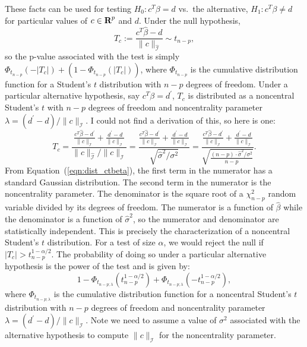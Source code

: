 \documentclass[12pt]{article}
\begin{document}
These facts can be used for testing $H_0: c^T \beta = d$ vs.~the alternative, $H_1: c^T \beta \neq d$ for particular values of $c \in {\mbox{\bf R}}^p$ and $d$. Under the null hypothesis,
\begin{equation}
\label{eqn:hts_olc}
   T_c := \frac{c^T \hat{\beta} - d}{\| c \|_{\hat{\mathcal{I}}}} \sim t_{n-p},
\end{equation}
so the p-value associated with the test is simply $\Phi_{t_{n-p}}(-|T_c|) + (1 - \Phi_{t_{n-p}}(|T_c|))$, where $\Phi_{t_{n-p}}$ is the cumulative distribution function for a Student's $t$ distribution with $n-p$ degrees of freedom. Under a particular alternative hypothesis, say $c^T \beta = d^\prime$, $T_c$ is distributed as a noncentral Student's $t$ with $n-p$ degrees of freedom and noncentrality parameter $\lambda = (d^\prime-d)/\| c \|_\mathcal{I}$. I could not find a derivation of this, so here is one:
\begin{displaymath}
   T_c = \frac{\frac{c^T \hat{\beta} - d^\prime}{\| c \|_\mathcal{I}} + \frac{d^\prime - d}{\| c \|_\mathcal{I}}}{\| c \|_{\hat{\mathcal{I}}} / \| c \|_\mathcal{I}}
   = \frac{\frac{c^T \hat{\beta} - d^\prime}{\| c \|_\mathcal{I}} + \frac{d^\prime - d}{\| c \|_\mathcal{I}}}{\sqrt{\hat{\sigma}^2 / \sigma^2}}
   = \frac{\frac{c^T \hat{\beta} - d^\prime}{\| c \|_\mathcal{I}} + \frac{d^\prime - d}{\| c \|_\mathcal{I}}}{\sqrt{\frac{(n-p) \cdot \hat{\sigma}^2 / \sigma^2}{n-p}}}.
\end{displaymath}
From Equation~(\ref{eqn:dist_ctbeta}), the first term in the numerator has a standard Gaussian distribution. The second term in the numerator is the noncentrality parameter. The denominator is the square root of a $\chi_{n-p}^2$ random variable divided by its degrees of freedom. The numerator is a function of $\hat{\beta}$ while the denominator is a function of $\hat{\sigma}^2$, so the numerator and denominator are statistically independent. This is precisely the characterization of a noncentral Student's $t$ distribution. For a test of size $\alpha$, we would reject the null if $|T_c| > t_{n-p}^{1-\alpha/2}$. The probability of doing so under a particular alternative hypothesis is the power of the test and is given by:
\begin{displaymath}
1 - \Phi_{t_{n-p; \lambda}}(t_{n-p}^{1-\alpha/2}) + \Phi_{t_{n-p; \lambda}}(-t_{n-p}^{1-\alpha/2}),
\end{displaymath}
where $\Phi_{t_{n-p; \lambda}}$ is the cumulative distribution function for a noncentral Student's $t$ distribution with $n-p$ degrees of freedom and noncentrality parameter $\lambda = (d^\prime-d)/\| c \|_\mathcal{I}$. Note we need to assume a value of $\sigma^2$ associated with the alternative hypothesis to compute $\| c \|_\mathcal{I}$ for the noncentrality parameter.
\end{document}
